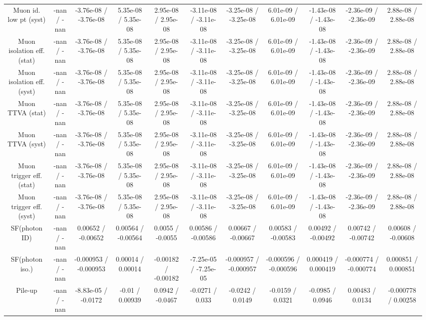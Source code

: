 \begin{table}[htbp]
\begin{center}
\begin{tabular}{|c|c|c|c|c|c|c|c|c|c|c|}
  Muon id. low pt (syst) & -nan / -nan & -3.76e-08 / -3.76e-08 & 5.35e-08 / 5.35e-08 & 2.95e-08 / 2.95e-08 & -3.11e-08 / -3.11e-08 & -3.25e-08 / -3.25e-08 & 6.01e-09 / 6.01e-09 & -1.43e-08 / -1.43e-08 & -2.36e-09 / -2.36e-09 & 2.88e-08 / 2.88e-08 \\ 
  Muon isolation eff. (stat) & -nan / -nan & -3.76e-08 / -3.76e-08 & 5.35e-08 / 5.35e-08 & 2.95e-08 / 2.95e-08 & -3.11e-08 / -3.11e-08 & -3.25e-08 / -3.25e-08 & 6.01e-09 / 6.01e-09 & -1.43e-08 / -1.43e-08 & -2.36e-09 / -2.36e-09 & 2.88e-08 / 2.88e-08 \\ 
  Muon isolation eff. (syst) & -nan / -nan & -3.76e-08 / -3.76e-08 & 5.35e-08 / 5.35e-08 & 2.95e-08 / 2.95e-08 & -3.11e-08 / -3.11e-08 & -3.25e-08 / -3.25e-08 & 6.01e-09 / 6.01e-09 & -1.43e-08 / -1.43e-08 & -2.36e-09 / -2.36e-09 & 2.88e-08 / 2.88e-08 \\ 
  Muon TTVA (stat) & -nan / -nan & -3.76e-08 / -3.76e-08 & 5.35e-08 / 5.35e-08 & 2.95e-08 / 2.95e-08 & -3.11e-08 / -3.11e-08 & -3.25e-08 / -3.25e-08 & 6.01e-09 / 6.01e-09 & -1.43e-08 / -1.43e-08 & -2.36e-09 / -2.36e-09 & 2.88e-08 / 2.88e-08 \\ 
  Muon TTVA (syst) & -nan / -nan & -3.76e-08 / -3.76e-08 & 5.35e-08 / 5.35e-08 & 2.95e-08 / 2.95e-08 & -3.11e-08 / -3.11e-08 & -3.25e-08 / -3.25e-08 & 6.01e-09 / 6.01e-09 & -1.43e-08 / -1.43e-08 & -2.36e-09 / -2.36e-09 & 2.88e-08 / 2.88e-08 \\ 
  Muon trigger eff. (stat) & -nan / -nan & -3.76e-08 / -3.76e-08 & 5.35e-08 / 5.35e-08 & 2.95e-08 / 2.95e-08 & -3.11e-08 / -3.11e-08 & -3.25e-08 / -3.25e-08 & 6.01e-09 / 6.01e-09 & -1.43e-08 / -1.43e-08 & -2.36e-09 / -2.36e-09 & 2.88e-08 / 2.88e-08 \\ 
  Muon trigger eff. (syst) & -nan / -nan & -3.76e-08 / -3.76e-08 & 5.35e-08 / 5.35e-08 & 2.95e-08 / 2.95e-08 & -3.11e-08 / -3.11e-08 & -3.25e-08 / -3.25e-08 & 6.01e-09 / 6.01e-09 & -1.43e-08 / -1.43e-08 & -2.36e-09 / -2.36e-09 & 2.88e-08 / 2.88e-08 \\ 
  SF(photon ID) & -nan / -nan & 0.00652 / -0.00652 & 0.00564 / -0.00564 & 0.0055 / -0.0055 & 0.00586 / -0.00586 & 0.00667 / -0.00667 & 0.00583 / -0.00583 & 0.00492 / -0.00492 & 0.00742 / -0.00742 & 0.00608 / -0.00608 \\ 
  SF(photon iso.) & -nan / -nan & -0.000953 / -0.000953 & 0.00014 / 0.00014 & -0.00182 / -0.00182 & -7.25e-05 / -7.25e-05 & -0.000957 / -0.000957 & -0.000596 / -0.000596 & 0.000419 / 0.000419 & -0.000774 / -0.000774 & 0.000851 / 0.000851 \\ 
  Pile-up & -nan / -nan & -8.83e-05 / -0.0172 & -0.01 / 0.00939 & 0.0942 / -0.0467 & -0.0271 / 0.033 & -0.0242 / 0.0149 & -0.0159 / 0.0321 & -0.0985 / 0.0946 & 0.00483 / 0.0134 & -0.000778 / 0.00258 \\ 

\end{tabular}
\end{center}
\end{table}
